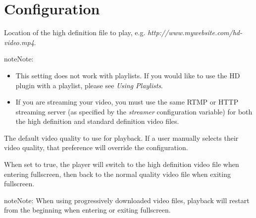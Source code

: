 \documentclass[letterpaper,10pt,english]{sphinxmanual}
\begin{document}
\chapter{Configuration}
\label{index:configuration}

\begin{fulllineitems}
Location of the high definition file to play, e.g. \emph{http://www.mywebsite.com/hd-video.mp4}.

\begin{notice}{note}{Note:}\begin{itemize}
\item {} 
This setting does not work with playlists. If you would like to use the HD plugin with a playlist, please see \emph{Using Playlists}.

\item {} 
If you are streaming your video, you must use the same RTMP or HTTP streaming server (as specified by the \emph{streamer} configuration variable) for both the high definition and standard definition video files.

\end{itemize}
\end{notice}

\end{fulllineitems}



\begin{fulllineitems}
The default video quality to use for playback. If a user manually selects their video quality, that preference will override the configuration.

\end{fulllineitems}



\begin{fulllineitems}
When set to true, the player will switch to the high definition video file when entering fullscreen, then back to the normal quality video file when exiting fullscreen.

\begin{notice}{note}{Note:}
When using progressively downloaded video files, playback will restart from the beginning when entering or exiting fullscreen.
\end{notice}

\end{fulllineitems}
\end{document}
